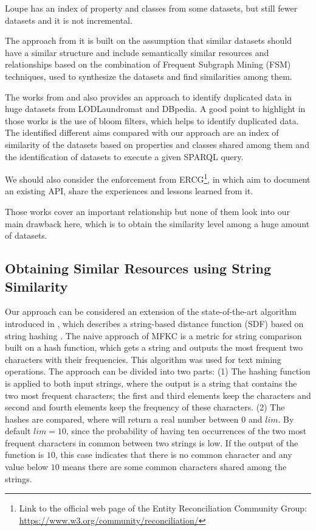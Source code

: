 Loupe \cite{mihindukulasooriya2016two} has an index of property and classes from some datasets, but still fewer datasets and it is not incremental.

The approach from \cite{emaldi2015detection} it is built on the assumption that similar datasets should have a similar structure and include semantically similar resources and relationships based on the combination of Frequent Subgraph Mining (FSM) techniques, used to synthesize the datasets and find similarities among them.

The works from \cite{baron-2016-ldow-assessing-links} and \cite{BaronKKPEH2017IDOL} also provides an approach to identify duplicated data in huge datasets from LODLaundromat and DBpedia. A good point to highlight in those works is the use of bloom filters, which helps to identify duplicated data. The identified different aims compared with our approach are an index of similarity of the datasets based on properties and classes shared among them and the identification of datasets to execute a given SPARQL query. 

We should also consider the enforcement from \ac{ERCG}\footnote{Link to the official web page of the Entity Reconciliation Community Group: \url{https://www.w3.org/community/reconciliation/}}, in which aim to document an existing API, share the experiences and lessons learned from it\cite{DBLP:journals/corr/abs-1906-08092}.

Those works cover an important relationship but none of them look into our main drawback here, which is to obtain the similarity level among a huge amount of datasets.

\subsection{Obtaining Similar Resources using String Similarity}
Our approach\cite{valdestilhas2017high} can be considered an extension of the state-of-the-art algorithm introduced in \cite{seker2014novel}, %
which describes a string-based distance function (SDF) based on string hashing \cite{seker2013novel,rivest1992md5}.
The naive approach of MFKC \cite{seker2014novel} is a metric for string comparison built on a hash function, which gets a string and outputs the most frequent two characters with their frequencies. 
This algorithm was used for text mining operations.
The approach can be divided into two parts: 
(1) The hashing function is applied to both input strings, where the output is a string that contains the two most frequent characters;
the first and third elements keep the characters and second and fourth elements keep the frequency of these characters. 
(2) The hashes are compared, where will return a real number between $0$ and $lim$.
By default $lim=10$, since the probability of having ten occurrences of the two most frequent characters in common between two strings is low. 
If the output of the function is $10$, this case indicates that there is no common character and any value below $10$ means there are some common characters shared among the strings.

